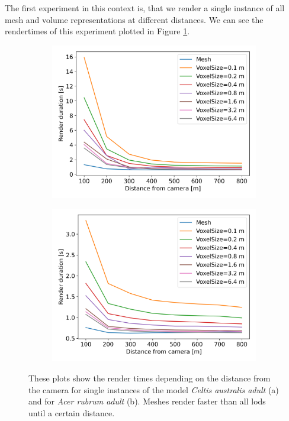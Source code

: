The first experiment in this context is, that we render a single instance of all mesh and volume representations at different distances.
We can see the rendertimes of this experiment plotted in Figure \ref{fig:render_time_comparisons}.
\begin{figure}[ht]
    \centering
    \begin{subfigure}[b]{0.49\linewidth}
        \centering
        \includegraphics[width=1\linewidth]{img/results/render_durations_EU06a.png}
        \caption{}
    \end{subfigure}
    \begin{subfigure}[b]{0.49\linewidth}
        \centering
        \includegraphics[width=1\linewidth]{img/results/render_durations_EA01a.png}
        \caption{}
    \end{subfigure}
	\caption[Plots of the render times depending on the distance from the camera]{These plots show the render times depending on the distance from the camera for single instances of the model \textit{Celtis australis adult} (a) and for \textit{Acer rubrum adult} (b). Meshes render faster than all \acsp{lod} until a certain distance.}
	\label{fig:render_time_comparisons}
\end{figure}
